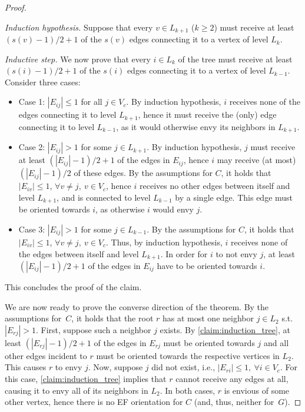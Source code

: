\begin{proof}
\begin{nestedproof}
    \emph{Induction hypothesis.} Suppose that every $v\in L_{k+1}$ ($k\geq 2$) must receive at least $(s(v)-1)/2 +1$ of the $s(v)$ edges connecting it to a vertex of level $L_k$.

    \emph{Inductive step.} We now prove that every $i\in L_k$ of the tree must receive at least $(s(i)-1)/2 +1$ of the $s(i)$ edges connecting it to a vertex of level $L_{k-1}$. Consider three cases:
    \begin{itemize}
        \item Case 1: $|E_{ij}|\leq 1$ for all $j\in V_c$. By induction hypothesis, $i$ receives none of the edges connecting it to level $L_{k+1}$, hence it must receive the (only) edge connecting it to level $L_{k-1}$, as it would otherwise envy its neighbors in $L_{k+1}$.
        \item Case 2: $|E_{ij}|>1$ for some $j\in L_{k+1}$. By induction hypothesis, $j$ must receive at least $(|E_{ij}|-1)/2 +1$ of the edges in $E_{ij}$, hence $i$ may receive (at most) $(|E_{ij}|-1)/2$ of these edges. By the assumptions for $C$, it holds that $|E_{iv}| \leq 1$, $\forall v\neq j,\ v\in V_c$, hence $i$ receives no other edges between itself and level $L_{k+1}$, and is connected to level $L_{k-1}$ by a single edge. This edge must be oriented towards $i$, as otherwise $i$ would envy $j$.
        \item Case 3: $|E_{ij}|>1$ for some $j\in L_{k-1}$. By the assumptions for $C$, it holds that $|E_{iv}| \leq 1$, $\forall v\neq j,\ v\in V_c$. Thus, by induction hypothesis, $i$ receives none of the edges between itself and level $L_{k+1}$. In order for $i$ to not envy $j$, at least $(|E_{ij}|-1)/2 +1$ of the edges in $E_{ij}$ have to be oriented towards $i$.
    \end{itemize}
    This concludes the proof of the claim.
    \end{nestedproof}
    We are now ready to prove the converse direction of the theorem. By the assumptions for~$C$, it holds that the root $r$ has at most one neighbor $j\in L_{2}$ s.t. $|E_{rj}|>1$. First, suppose such a neighbor $j$ exists. By \cref{claim:induction_tree}, at least $(|E_{rj}|-1)/2 +1$ of the edges in $E_{rj}$ must be oriented towards $j$ and all other edges incident to $r$ must be oriented towards the respective vertices in $L_{2}$. This causes $r$ to envy $j$. Now, suppose $j$ did not exist, i.e., $|E_{ri}|\leq 1,\ \forall i\in V_c$. For this case, \cref{claim:induction_tree} implies that $r$ cannot receive any edges at all, causing it to envy all of its neighbors in $L_2$. In both cases, $r$ is envious of some other vertex, hence there is no EF orientation for $C$ (and, thus, neither for~$G$).
\end{proof}

